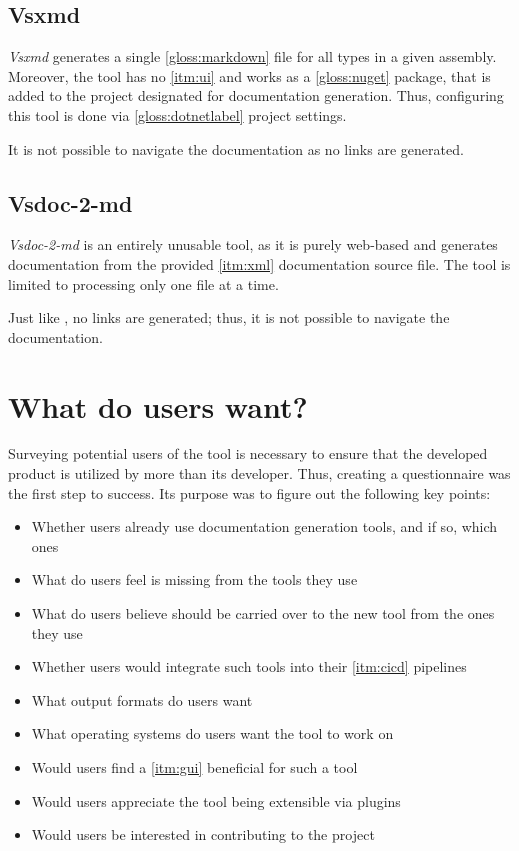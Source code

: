 \subsection{Vsxmd} \label{ssec:vsxmd}

\textit{Vsxmd} generates a single \ref{gloss:markdown} file for all types in a given assembly. Moreover, the tool has no \ref{itm:ui} and works as a \ref{gloss:nuget} package, that is added to the project designated for documentation generation. Thus, configuring this tool is done via \ref{gloss:dotnetlabel} project settings.

It is not possible to navigate the documentation as no links are generated.

\subsection{Vsdoc-2-md}

\textit{Vsdoc-2-md} is an entirely unusable tool, as it is purely web-based and generates documentation from the provided \ref{itm:xml} documentation source file. The tool is limited to processing only one file at a time.

Just like \textit{}, no links are generated; thus, it is not possible to navigate the documentation.

\newpage

\section{What do users want?} \label{sec:whatdouserswant}
Surveying potential users of the tool is necessary to ensure that the developed product is utilized by more than its developer.
Thus, creating a questionnaire was the first step to success. Its purpose was to figure out the following key points:
\begin{itemize}
    \item Whether users already use documentation generation tools, and if so, which ones
    \item What do users feel is missing from the tools they use
    \item What do users believe should be carried over to the new tool from the ones they use
    \item Whether users would integrate such tools into their \ref{itm:cicd} pipelines
    \item What output formats do users want
    \item What operating systems do users want the tool to work on
    \item Would users find a \ref{itm:gui} beneficial for such a tool
    \item Would users appreciate the tool being extensible via plugins
    \item Would users be interested in contributing to the project
\end{itemize}

